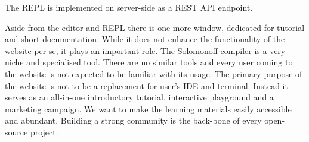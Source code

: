 The REPL is implemented on server-side as a REST API endpoint. 

Aside from the editor and REPL there is one more window, dedicated for tutorial and short documentation.  While it does not enhance the functionality of the website per se, it plays an important role. The Solomonoff compiler is a very niche and specialised tool. There are no similar tools and every user coming to the website is not expected to be familiar with its usage. The primary purpose of the website is not to be a replacement for user's IDE and terminal. Instead it serves as an all-in-one introductory tutorial, interactive playground and a marketing campaign. We want to make the learning materials easily accessible and abundant. Building a strong community is the back-bone of every open-source project. 










